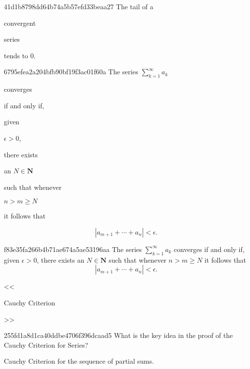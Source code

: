 \begin{note}{41d1b8798dd64b74a5b57efd33beaa27}
    The tail of a \begin{icloze}{2}convergent\end{icloze} series \begin{icloze}{1}tends to \({ 0 }\).\end{icloze}
\end{note}

\begin{note}{6795efea2a204bfb90bf19f3ac01f60a}
    The series \({ \sum_{k=1}^{\infty} a_k }\) \begin{icloze}{5}converges\end{icloze} \begin{icloze}{4}if and only if,\end{icloze} given \begin{icloze}{3}\({ \epsilon > 0 }\),\end{icloze} there exists \begin{icloze}{2}an \({ N \in \mathbf{N} }\)\end{icloze} such that whenever \begin{icloze}{2}\({ n > m \geq N }\)\end{icloze} it follows that
    \begin{icloze}{1}
        \[
            \left\lvert a_{m + 1} + \cdots + a_n \right\rvert < \epsilon.
        \]
    \end{icloze}
\end{note}

\begin{note}{f83e35fa266b4b71ae674a5ae53196aa}
    The series \({ \sum_{k=1}^{\infty} a_k }\) converges if and only if, given \({ \epsilon > 0 }\), there exists an \({ N \in \mathbf{N} }\) such that whenever \({ n > m \geq N }\) it follows that
    \[
        \left\lvert a_{m + 1} + \cdots + a_n \right\rvert < \epsilon.
    \]

    \begin{center}
        \tiny
        <<\begin{icloze}{1}Cauchy Criterion\end{icloze}>>
    \end{center}
\end{note}

\begin{note}{255fd1a8d1ca40ddbe4706f396dcaad5}
    What is the key idea in the proof of the Cauchy Criterion for Series?

    \begin{cloze}{1}
        Cauchy Criterion for the sequence of partial sums.
    \end{cloze}
\end{note}

